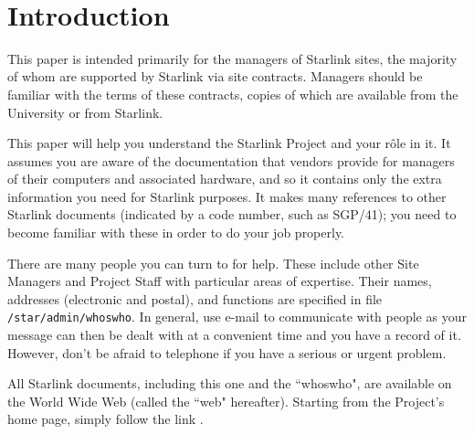 \stardocabstract
\newpage
 \begin{latexonly}
   \setlength{\parskip}{0mm}
   \latexonlytoc
   \setlength{\parskip}{\medskipamount}
   \markright{\stardocname}
 \end{latexonly}
\newpage
~
\newpage
\renewcommand{\thepage}{\arabic{page}}
\setcounter{page}{1}

\section {\label{introduction}Introduction}

This paper is intended primarily for the managers of Starlink sites,
the majority of whom are supported by Starlink via site contracts.
Managers should be familiar with the terms of these contracts, copies of which
are available from the University or from Starlink.

This paper will help you understand the Starlink Project and your
r\^{o}le in it.
It assumes you are aware of the documentation that vendors provide for managers
of their computers and associated hardware, and so it contains only the extra
information you need for Starlink purposes.
It makes many references to other Starlink documents (indicated by a code
number, such as SGP/41); you need to become familiar with these in order to do
your job properly.

There are many people you can turn to for help.
These include other Site Managers and Project Staff with particular areas
of expertise.
Their names, addresses (electronic and postal), and functions are specified in
file {\tt /star/admin/whoswho}.
In general, use e-mail to communicate with people as your message can then be
dealt with at a convenient time and you have a record of it.
However, don't be afraid to telephone if you have a serious or urgent problem.

All Starlink documents, including this one and the ``whoswho", are available
on the World Wide Web (called the ``web" hereafter).
Starting from the Project's home page, simply follow the link
.

